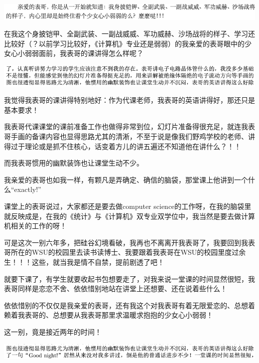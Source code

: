 \documentclass[9pt, b5paper]{article}
\begin{document}
\begin{center}
\includegraphics[width=.9\linewidth]{./pic/backups_plans_20210506_114236.png}
\end{center}

在我这个身披铠甲、全副武装、一副战威威、军功威赫、沙场战将的样子、学习还比较好（？以前学习比较好，《计算机》专业还是弱弱）的我亲爱的表哥眼中的少女心小弱弱面前，我表哥的课讲得怎么样呢？

\begin{center}
\includegraphics[width=.9\linewidth]{./pic/backups_plans_20210505_210944.png}
\end{center}

我觉得我表哥的课讲得特别地好：作为代课老师，我表哥的英语讲得好，那还只是基本要求！

我表哥代课课堂的课前准备工作也做得非常到位，幻灯片准备得很充足，就连我表哥手画的备课内容也显得思路尤其的清淅，不至于说是像我们野鸡学校的老师、讲得过于理论或是抓不住核心，话变着方儿的讲五遍还不知道他在讲什么？！！

而我表哥惯用的幽默装饰也让课堂生动不少。

我亲爱的表哥也如我一样，有颗凡是弄确定、确信的脑袋，那堂课上他讲到一个什么“exactly!”

课堂上的表哥说过，大家都还是要去做computer science的工作呀，在我的脑袋里就反映成是，在我的《统计》与《计算机》双专业双学位中，我当然是要去做计算机相关的工作的呀！

可是这次一别六年多，把硅谷幻境看破，我再也不离离开我表哥了，我要回到我表哥所在的WSU的校园里去读书读博士、我要跟着我表哥在WSU的校园里度过余生！！！这些，就当我是情不自禁，提前剧透了吧！

就要下课了，有学生就要收起书包想要走了，对我来说一堂课的时间显然很短，我表哥同样是恋恋不舍、依依惜别地站在讲堂上还想要、还在说着些什么！

依依惜别的不仅仅是我亲爱的表哥，还有我这个对我表哥有着无限爱恋的、总想着赖着我表哥的、总想要从我表哥那里求温暖求抱抱的少女心小弱弱！

这一别，竟是接近两年的时间！

\begin{center}
\includegraphics[width=.9\linewidth]{./pic/backups_plans_20210505_211808.png}
\end{center}
\end{document}
